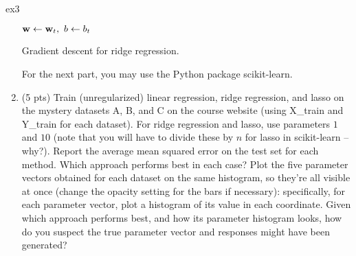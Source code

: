 \documentclass{tron}
\newcommand{\mref}[1]{\underline{\textbf{\hypersetup{linkcolor=orange}\Cref{#1}\hypersetup{linkcolor=blue}}}}
\begin{document}
\begin{exercise}{ex3}
\begin{enumerate}
\begin{algorithm}[H]
	$\mathbf{w} \gets \mathbf{w}_t, ~ b \gets b_t$
	\caption{Gradient descent for ridge regression.}
	\label{alg:rr}
\end{algorithm}

    \ans{\mref{ans:3:2}}

For the next part, you may use the Python package scikit-learn.

\item (5 pts) Train (unregularized) linear regression, ridge regression, and lasso on the mystery datasets A, B, and C on the course website (using X\_train and Y\_train for each dataset).
  For ridge regression and lasso, use parameters $1$ and $10$ (note that you will have to divide these by $n$ for lasso in scikit-learn -- why?).
  Report the average mean squared error on the test set for each method.
  Which approach performs best in each case?
    Plot the five parameter vectors obtained for each dataset on the same histogram, so they're all visible at once (change the opacity setting for the bars if necessary): specifically, for each parameter vector, plot a histogram of its value in each coordinate.
    Given which approach performs best, and how its parameter histogram looks, how do you suspect the true parameter vector and responses might have been generated?

  \ans{\mref{ans:3:3}}
\end{enumerate}
\end{exercise}
\end{document}
